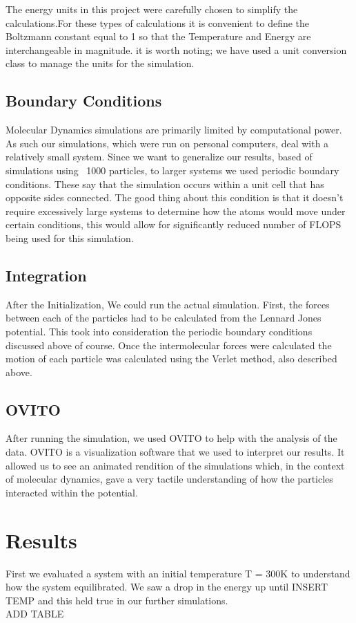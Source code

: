 \documentclass[11pt,twocolumn]{article}
\begin{document}
The energy units in this project were carefully chosen to simplify the calculations.For these types of calculations it is convenient to define the Boltzmann constant equal to 1 so that the Temperature and Energy are interchangeable in magnitude. it is worth noting; we have used a unit conversion class to manage the units for the simulation.   

\subsection{Boundary Conditions}
Molecular Dynamics simulations are primarily limited by computational power. As such our simulations, which were run on personal computers, deal with a relatively small system. Since we want to generalize our results, based of simulations using ~1000 particles, to larger systems we used periodic boundary conditions. These say that the simulation occurs within a unit cell that has opposite sides connected. The good thing about this condition is that it doesn't require excessively large systems to determine how the atoms would move under certain conditions, this would allow for significantly reduced number of FLOPS being used for this simulation.
\subsection{Integration}
After the Initialization, We could run the actual simulation. First, the forces between each of the particles had to be calculated from the Lennard Jones potential. This took into consideration the periodic boundary conditions discussed above of course. Once the intermolecular forces were calculated the motion of each particle was calculated using the Verlet method, also described above.  

\subsection{OVITO}
After running the simulation, we used OVITO to help with the analysis of the data. OVITO is a visualization software that we used to interpret our results. It allowed us to see an animated rendition of the simulations which, in the context of molecular dynamics, gave a very tactile understanding of how the particles interacted within the potential\cite{ovito}. 

\section{Results}
First we evaluated a system with an initial temperature T = 300K to understand how the system equilibrated. We saw a drop in the energy up until INSERT TEMP and this held true in our further simulations.\\
ADD TABLE
\\
\end{document}
